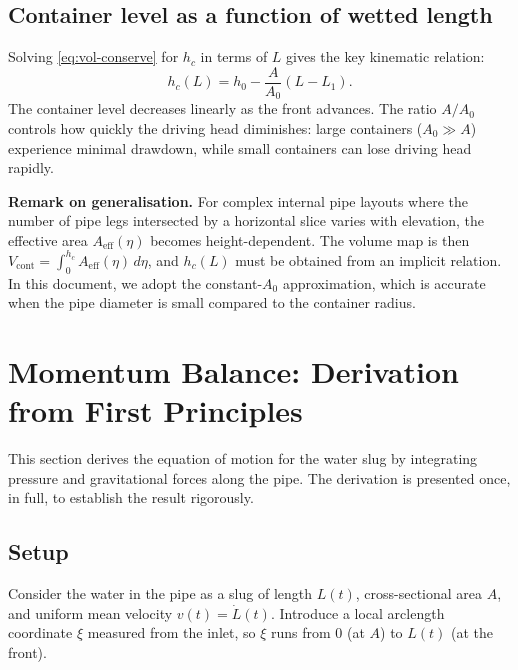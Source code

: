 \documentclass[11pt]{article}
\theoremstyle{definition}
\begin{document}
\subsection{Container level as a function of wetted length}

Solving \eqref{eq:vol-conserve} for $h_c$ in terms of $L$ gives the key kinematic relation:
\begin{equation}
  \boxed{h_c(L) = h_0 - \frac{A}{A_0}(L - L_1).}
  \label{eq:hc-of-L}
\end{equation}
The container level decreases linearly as the front advances. The ratio $A/A_0$ controls 
how quickly the driving head diminishes: large containers ($A_0 \gg A$) experience minimal 
drawdown, while small containers can lose driving head rapidly.

\textbf{Remark on generalisation.} For complex internal pipe layouts where the number of 
pipe legs intersected by a horizontal slice varies with elevation, the effective area 
$A_{\text{eff}}(\eta)$ becomes height-dependent. The volume map is then 
$V_{\text{cont}} = \int_0^{h_c} A_{\text{eff}}(\eta)\,d\eta$, and $h_c(L)$ must be obtained 
from an implicit relation. In this document, we adopt the constant-$A_0$ approximation, 
which is accurate when the pipe diameter is small compared to the container radius.

\section{Momentum Balance: Derivation from First Principles}
\label{sec:momentum}

This section derives the equation of motion for the water slug by integrating pressure and 
gravitational forces along the pipe. The derivation is presented once, in full, to establish 
the result rigorously.

\subsection{Setup}

Consider the water in the pipe as a slug of length $L(t)$, cross-sectional area $A$, and 
uniform mean velocity $v(t) = \dot{L}(t)$. Introduce a local arclength coordinate $\xi$ 
measured from the inlet, so $\xi$ runs from $0$ (at $A$) to $L(t)$ (at the front).
\end{document}
